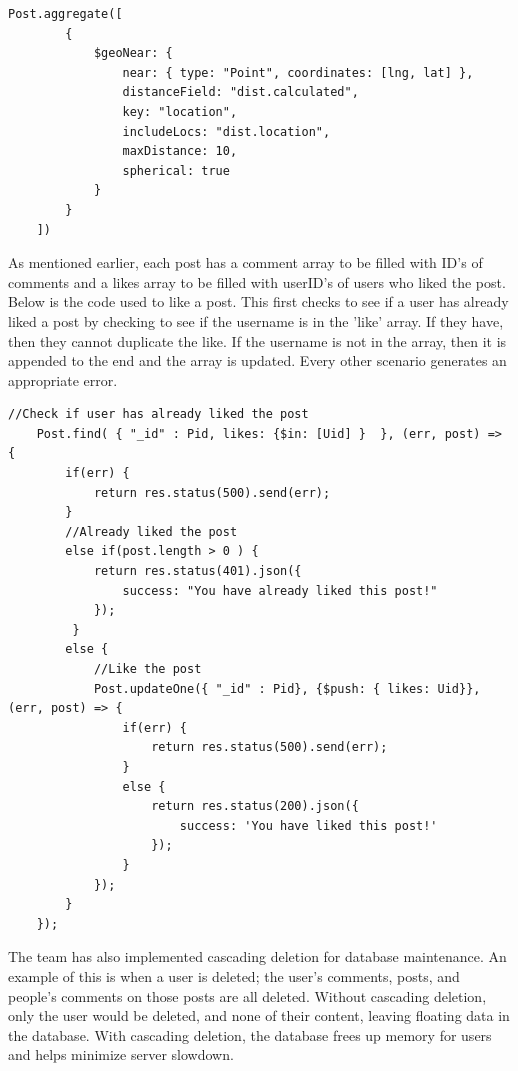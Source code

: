 \documentclass[draftclsnofoot, onecolumn, letterpaper,10pt,compsoc]{IEEEtran}
\begin{document}
\small{
\begin{lstlisting}[caption=Get Nearby Posts]
Post.aggregate([
        {
            $geoNear: {
                near: { type: "Point", coordinates: [lng, lat] },
                distanceField: "dist.calculated",
                key: "location",
                includeLocs: "dist.location",
                maxDistance: 10,
                spherical: true
            }
        }
    ])
\end{lstlisting}
}\newline

As mentioned earlier, each post has a comment array to be filled with ID's of comments and a likes array to be filled with userID's of users who liked the post.  Below is the code used to like a post.  This first checks to see if a user has already liked a post by checking to see if the username is in the 'like' array.  If they have, then they cannot duplicate the like.  If the username is not in the array, then it is appended to the end and the array is updated.  Every other scenario generates an appropriate error.
\small{
\begin{lstlisting}[caption=Liking a Post]
//Check if user has already liked the post
    Post.find( { "_id" : Pid, likes: {$in: [Uid] }  }, (err, post) => {
        if(err) {
            return res.status(500).send(err);
        }
        //Already liked the post
        else if(post.length > 0 ) {
            return res.status(401).json({
                success: "You have already liked this post!"
            });
         }
        else {
            //Like the post
            Post.updateOne({ "_id" : Pid}, {$push: { likes: Uid}}, (err, post) => {
                if(err) {
                    return res.status(500).send(err);
                }
                else {
                    return res.status(200).json({
                        success: 'You have liked this post!'
                    });
                }
            });
        }
    });
\end{lstlisting}
}
The team has also implemented cascading deletion for database maintenance.  An example of this is when a user is deleted; the user's comments, posts, and people's comments on those posts are all deleted.  Without cascading deletion, only the user would be deleted, and none of their content, leaving floating data in the database.  With cascading deletion, the database frees up memory for users and helps minimize server slowdown.
\pagebreak
\end{document}
